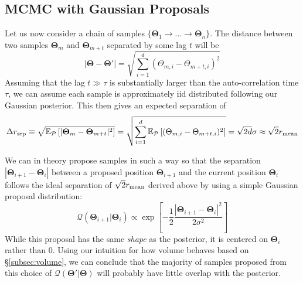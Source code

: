 \documentclass[12pt, titlepage]{article}
\newcommand{\meanwrt}[2]{\ensuremath{\mathbb{E}_{{#2}}\left[{#1}\right]}}
\newcommand{\params}{\ensuremath{\boldsymbol\Theta}}
\newcommand{\posterior}{\ensuremath{\mathcal{P}}}
\newcommand{\proposal}{\ensuremath{\mathcal{Q}}}
\begin{document}
\subsection{MCMC with Gaussian Proposals} \label{subsec:mcmc_gauss}

Let us now consider a chain of samples
$\{ \params_1 \rightarrow \dots \rightarrow \params_n \}$.
The distance between two samples
$\params_m$ and $\params_{m+t}$ 
separated by some lag $t$ will be
\begin{equation}
    |\params - \params'|
    = \sqrt{\sum_{i=1}^{d} (\Theta_{m,i} - \Theta_{m+t,i})^2}
\end{equation}
Assuming that the lag $t \gg \tau$ is
substantially larger than the auto-correlation time $\tau$,
we can assume each sample is approximately iid distributed following
our Gaussian posterior. This then gives an expected separation of
\begin{equation}
    \Delta r_{\rm sep} 
    \equiv \sqrt{\meanwrt{|\params_{m} - \params_{m+t}|^2}{\posterior}}
    = \sqrt{\sum_{i=1}^{d} \meanwrt{(\Theta_{m,i} - \Theta_{m+t,i})^2}{\posterior}}
    = \sqrt{2d} \sigma \approx \sqrt{2} r_{\rm mean}
\end{equation}

We can in theory propose samples in such a way so that the separation
$|\params_{i+1} - \params_{i}|$
between a proposed position $\params_{i+1}$ 
and the current position $\params_i$ follows the
ideal separation of $\sqrt{2}r_{\rm mean}$ derived above
by using a simple Gaussian proposal distribution:
\begin{equation}
    \proposal(\params_{i+1}|\params_i)
    \propto \exp\left[-\frac{1}{2}\frac{|\params_{i+1} - \params_i|^2}{2\sigma^2}\right]
\end{equation}
While this proposal has the same \textit{shape} as the posterior,
it is centered on $\params_i$ rather than $0$. Using our intuition for
how volume behaves based on \S\ref{subsec:volume}, we can
conclude that the majority of samples proposed from 
this choice of $\proposal(\params'|\params)$ will probably have little overlap
with the posterior. 
\end{document}
